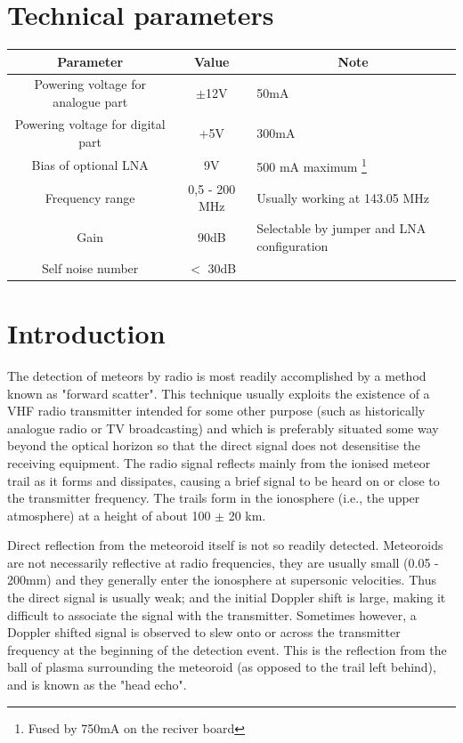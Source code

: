 \documentclass[12pt,a4paper,oneside]{article}
\begin{document}
\section{Technical parameters}
\begin{table}[htbp]
\begin{center}
\begin{tabular}{|c|c|p{5cm}|}
\hline
\multicolumn{1}{|c|}{Parameter} & \multicolumn{1}{|c|}{Value} & \multicolumn{1}{|c|}{Note} \\ \hline
Powering voltage for analogue part & $\pm$12V &  50mA \\ \hline
Powering voltage for digital part & +5V &  300mA \\ \hline
Bias of optional LNA & 9V &  500 mA maximum \footnote{Fused by 750mA on the reciver board} \\ \hline
Frequency range  & 0,5 - 200 MHz & Usually working at 143.05 MHz \\ \hline
Gain & 90dB & Selectable by jumper and LNA configuration \\ \hline
Self noise number & $<$ 30dB & \\ \hline
\end{tabular}
\end{center}
\end{table}

\newpage
\section{Introduction}

The detection of meteors by radio is most readily accomplished by a method known as "forward scatter".  This technique usually exploits the existence of a VHF radio transmitter intended for some other purpose (such as historically analogue radio or TV broadcasting) and which is preferably situated some way beyond the optical horizon so that the direct signal does not desensitise the receiving equipment.  The radio signal reflects mainly from the ionised meteor trail as it forms and dissipates, causing a brief signal to be heard on or close to the transmitter frequency.  The trails form in the ionosphere (i.e., the upper atmosphere) at a height of about 100 $\pm$ 20 km.

Direct reflection from the meteoroid itself  is not so readily detected.  Meteoroids are not necessarily reflective at radio frequencies, they are usually small (0.05 - 200mm) and they generally enter the ionosphere at supersonic velocities.  Thus the direct signal is usually weak; and the initial Doppler shift is  large, making it difficult to associate the signal with the transmitter.  Sometimes however, a Doppler shifted signal is observed to slew onto or across the transmitter frequency at the beginning of the detection event.  This is the reflection from the ball of plasma surrounding the meteoroid (as opposed to the trail left behind), and is known as the "head echo". 
\end{document}
